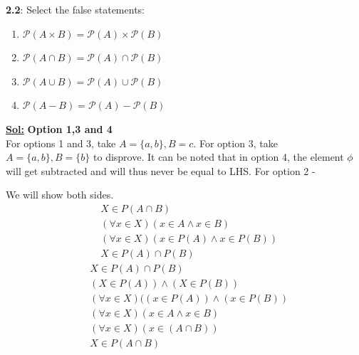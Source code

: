 \documentclass[xcolor=svgnames]{beamer}
\begin{document}
\begin{frame}
\textbf{2.2}: Select the false statements:
\begin{enumerate}
    \item $\mathcal{P}(A \times B) = \mathcal{P}(A) \times \mathcal{P}(B)$
    \item $\mathcal{P}(A \cap B) = \mathcal{P}(A) \cap \mathcal{P}(B)$
    \item $\mathcal{P}(A \cup B) = \mathcal{P}(A) \cup \mathcal{P}(B)$
    \item $\mathcal{P}(A - B) = \mathcal{P}(A) - \mathcal{P}(B)$
\end{enumerate}
\textbf{\underline{Sol:}} \textbf{Option 1,3 and 4} \\ 
For options 1 and 3, take $A = \{a,b\}, B = {c}$. For option 3, take $A = \{a,b\}, B = \{b\}$ to disprove. It can be noted that in option 4, the element $\phi$ will get subtracted and will thus never be equal to LHS. For option 2 - 
\begin{multicols}{2}
We will show both sides.
\begin{align*}
    &X \in P(A \cap B) \\
    &(\forall x \in X) ( x \in A \land x \in B) \\
    &(\forall x \in X) ( x \in P(A) \land x \in P(B)) \\
    &X \in P(A) \cap P(B)
\end{align*}
\begin{align*}
    &X \in P(A) \cap P(B) \\
    &(X \in P(A)) \land (X \in P(B)) \\
    &(\forall x \in X) (( x \in P(A)) \land (x \in P(B)) \\
    &(\forall x \in X) ( x \in A \land x \in B) \\
    &(\forall x \in X) ( x \in (A \cap B)) \\
    &X \in P(A \cap B)
\end{align*}
\end{multicols}

\end{frame}
\end{document}
